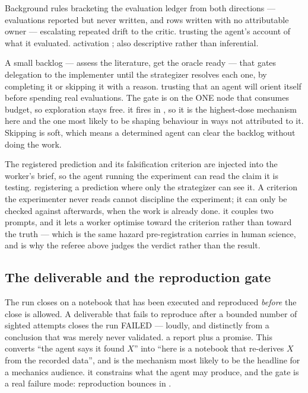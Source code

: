 {Background rules bracketing the evaluation ledger from both directions ---
evaluations reported but never written, and rows written with no attributable
owner --- escalating repeated drift to the critic.}
{trusting the agent's account of what it evaluated.}
{activation ; also descriptive rather
than inferential.}

{A small backlog --- assess the literature, get the oracle ready --- that gates
delegation to the implementer until the strategizer resolves each one, by
completing it or skipping it with a reason.}
{trusting that an agent will orient itself before spending real evaluations. The
gate is on the ONE node that consumes budget, so exploration stays free.}
{it fires in , so it is the
highest-dose mechanism here and the one most likely to be shaping behaviour in
ways not attributed to it. Skipping is soft, which means a determined agent can
clear the backlog without doing the work.}

{The registered prediction and its falsification criterion are injected into the
worker's brief, so the agent running the experiment can read the claim it is
testing.}
{registering a prediction where only the strategizer can see it. A criterion the
experimenter never reads cannot discipline the experiment; it can only be
checked against afterwards, when the work is already done.}
{it couples two prompts, and it lets a worker optimise toward the criterion
rather than toward the truth --- which is the same hazard pre-registration
carries in human science, and is why the referee above judges the verdict
rather than the result.}

\subsection{The deliverable and the reproduction gate}

{The run closes on a notebook that has been executed and reproduced
\emph{before} the close is allowed. A deliverable that fails to reproduce after
a bounded number of sighted attempts closes the run FAILED --- loudly, and
distinctly from a conclusion that was merely never validated.}
{a report plus a promise. This converts ``the agent says it found $X$'' into
``here is a notebook that re-derives $X$ from the recorded data'', and is the
mechanism most likely to be the headline for a mechanics audience.}
{it constrains what the agent may produce, and the gate is a real failure mode:
reproduction bounces in .}

